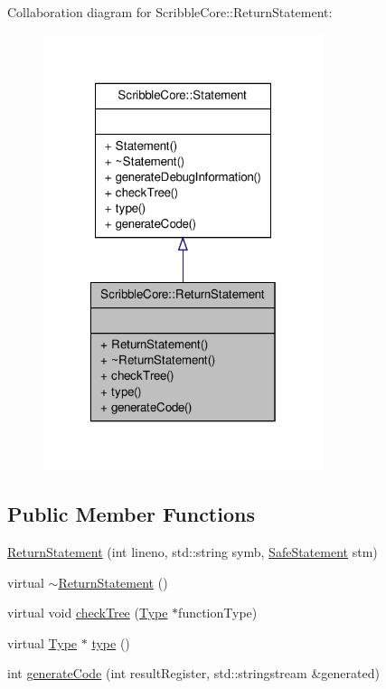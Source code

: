 Collaboration diagram for Scribble\-Core\-:\-:Return\-Statement\-:
\nopagebreak
\begin{figure}[H]
\begin{center}
\leavevmode
\includegraphics[width=232pt]{class_scribble_core_1_1_return_statement__coll__graph}
\end{center}
\end{figure}
\subsection*{Public Member Functions}
\begin{DoxyCompactItemize}
\item 
\hyperlink{class_scribble_core_1_1_return_statement_a2f22388b0074e0093634f470fdc168db}{Return\-Statement} (int lineno, std\-::string symb, \hyperlink{namespace_scribble_core_a2ad5bf236bc9164cb56f564685f15a11}{Safe\-Statement} stm)
\item 
virtual \hyperlink{class_scribble_core_1_1_return_statement_a249adfc41c7634d1f29fff530c831e11}{$\sim$\-Return\-Statement} ()
\item 
virtual void \hyperlink{class_scribble_core_1_1_return_statement_a4f93dfa382b64c53a404d9c381552670}{check\-Tree} (\hyperlink{class_scribble_core_1_1_type}{Type} $\ast$function\-Type)
\item 
virtual \hyperlink{class_scribble_core_1_1_type}{Type} $\ast$ \hyperlink{class_scribble_core_1_1_return_statement_a4d5daf10f1b3460311960d5c3f609da9}{type} ()
\item 
int \hyperlink{class_scribble_core_1_1_return_statement_a11ad3cbcb2a819c5a67d997694b6dbe0}{generate\-Code} (int result\-Register, std\-::stringstream \&generated)
\end{DoxyCompactItemize}


